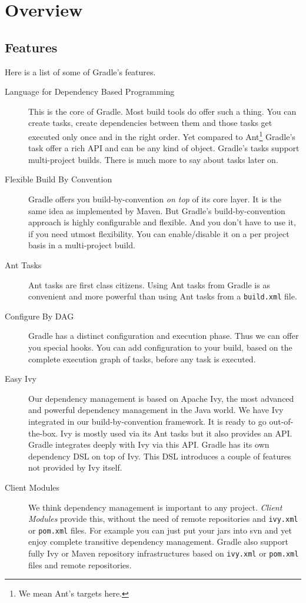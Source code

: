 \chapter{Overview} %
\label{cha:overview}

\section{Features} %
\label{sec:special_feature_of_gradle}
Here is a list of some of Gradle's features.
\begin{description}	
	\item[Language for Dependency Based Programming] This is the core of Gradle. Most build tools do offer such a thing. You can create tasks, create dependencies between them and those tasks get executed only once and in the right order. Yet compared to Ant\footnote{We mean Ant's targets here.} Gradle's task offer a rich API and can be any kind of object. Gradle's tasks support multi-project builds. There is much more to say about tasks later on.
	\item[Flexible Build By Convention] Gradle offers you build-by-convention \emph{on top} of its core layer. It is the same idea as implemented by Maven. But Gradle's build-by-convention approach is highly configurable and flexible. And you don't have to use it, if you need utmost flexibility. You can enable/disable it on a per project basis in a multi-project build. 
	\item[Ant Tasks] Ant tasks are first class citizens. Using Ant tasks from Gradle is as convenient and more powerful than using Ant tasks from a \texttt{build.xml} file.
	\item[Configure By DAG] Gradle has a distinct configuration and execution phase. Thus we can offer you special hooks. You can add configuration to your build, based on the complete execution graph of tasks, before any task is executed.
	\item[Easy Ivy] Our dependency management is based on Apache Ivy, the most advanced and powerful dependency management in the Java world. We have Ivy integrated in our build-by-convention framework. It is ready to go out-of-the-box. Ivy is mostly used via its Ant tasks but it also provides an API. Gradle integrates deeply with Ivy via this API. Gradle has its own dependency DSL on top of Ivy. This DSL introduces a couple of features not provided by Ivy itself.
	\item[Client Modules] We think dependency management is important to any project. \emph{Client Modules} provide this, without the need of remote repositories and \texttt{ivy.xml} or \texttt{pom.xml} files. For example you can just put your jars into svn and yet enjoy complete transitive dependency management. Gradle also support fully Ivy or Maven repository infrastructures based on \texttt{ivy.xml} or \texttt{pom.xml} files and remote repositories.

\end{description}
